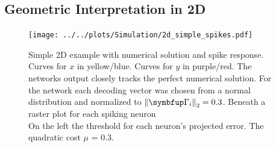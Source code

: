\subsection{Geometric Interpretation in 2D}
\begin{figure}[h!]
	\centering
	\texttt{[image: ../../plots/Simulation/2d\_simple\_spikes.pdf]}
	\caption{Simple 2D example with numerical solution and spike response. Curves for $x$ in yellow/blue. Curves for $y$ in purple/red. The networks output closely tracks the perfect numerical solution. For the network each decoding vector was chosen from a normal distribution and normalized to $\left\lVert\bmu{\Gamma}_i\right\rVert_2 =0.3$. Beneath a raster plot for each spiking neuron \\ On the left the threshold for each neuron's projected error. The quadratic cost $\mu$ = 0.3.}
	\label{fig:sim_res_geometric}
\end{figure}


